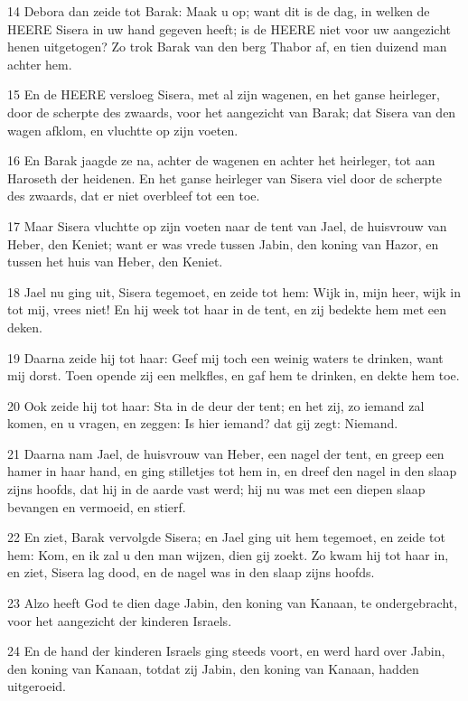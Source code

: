 \par 14 Debora dan zeide tot Barak: Maak u op; want dit is de dag, in welken de HEERE Sisera in uw hand gegeven heeft; is de HEERE niet voor uw aangezicht henen uitgetogen? Zo trok Barak van den berg Thabor af, en tien duizend man achter hem.
\par 15 En de HEERE versloeg Sisera, met al zijn wagenen, en het ganse heirleger, door de scherpte des zwaards, voor het aangezicht van Barak; dat Sisera van den wagen afklom, en vluchtte op zijn voeten.
\par 16 En Barak jaagde ze na, achter de wagenen en achter het heirleger, tot aan Haroseth der heidenen. En het ganse heirleger van Sisera viel door de scherpte des zwaards, dat er niet overbleef tot een toe.
\par 17 Maar Sisera vluchtte op zijn voeten naar de tent van Jael, de huisvrouw van Heber, den Keniet; want er was vrede tussen Jabin, den koning van Hazor, en tussen het huis van Heber, den Keniet.
\par 18 Jael nu ging uit, Sisera tegemoet, en zeide tot hem: Wijk in, mijn heer, wijk in tot mij, vrees niet! En hij week tot haar in de tent, en zij bedekte hem met een deken.
\par 19 Daarna zeide hij tot haar: Geef mij toch een weinig waters te drinken, want mij dorst. Toen opende zij een melkfles, en gaf hem te drinken, en dekte hem toe.
\par 20 Ook zeide hij tot haar: Sta in de deur der tent; en het zij, zo iemand zal komen, en u vragen, en zeggen: Is hier iemand? dat gij zegt: Niemand.
\par 21 Daarna nam Jael, de huisvrouw van Heber, een nagel der tent, en greep een hamer in haar hand, en ging stilletjes tot hem in, en dreef den nagel in den slaap zijns hoofds, dat hij in de aarde vast werd; hij nu was met een diepen slaap bevangen en vermoeid, en stierf.
\par 22 En ziet, Barak vervolgde Sisera; en Jael ging uit hem tegemoet, en zeide tot hem: Kom, en ik zal u den man wijzen, dien gij zoekt. Zo kwam hij tot haar in, en ziet, Sisera lag dood, en de nagel was in den slaap zijns hoofds.
\par 23 Alzo heeft God te dien dage Jabin, den koning van Kanaan, te ondergebracht, voor het aangezicht der kinderen Israels.
\par 24 En de hand der kinderen Israels ging steeds voort, en werd hard over Jabin, den koning van Kanaan, totdat zij Jabin, den koning van Kanaan, hadden uitgeroeid.

